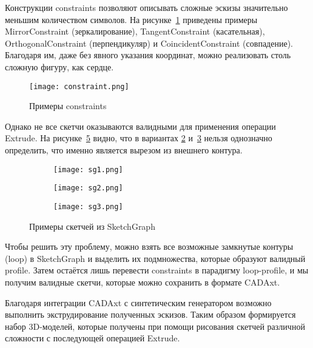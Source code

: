 Конструкции constraints позволяют описывать сложные эскизы значительно меньшим количеством символов. На рисунке~\ref{fig:constraint} приведены примеры MirrorConstraint (зеркалирование), TangentConstraint (касательная), OrthogonalConstraint (перпендикуляр) и CoincidentConstraint (совпадение). Благодаря им, даже без явного указания координат, можно реализовать столь сложную фигуру, как сердце.

\begin{figure}[h!]
    \centering
    \texttt{[image: constraint.png]}
    \caption{Примеры constraints}
    \label{fig:constraint}
\end{figure}

Однако не все скетчи оказываются валидными для применения операции Extrude. На рисунке~\ref{fig:sketchgraph} видно, что в вариантах \ref{fig:sg1} и~\ref{fig:sg2} нельзя однозначно определить, что именно является вырезом из внешнего контура.

\begin{figure}[h!]
    \centering
    \begin{subfigure}[b]{0.3\textwidth}
        \centering
        \texttt{[image: sg1.png]}
        \caption{}
        \label{fig:sg1}
    \end{subfigure}
    \hfill
    \begin{subfigure}[b]{0.3\textwidth}
        \centering
        \texttt{[image: sg2.png]}
        \caption{}
        \label{fig:sg2}
    \end{subfigure}
    \hfill
    \begin{subfigure}[b]{0.3\textwidth}
        \centering
        \texttt{[image: sg3.png]}
        \caption{}
        \label{fig:sg3}
    \end{subfigure}
    \caption{Примеры скетчей из SketchGraph}
    \label{fig:sketchgraph}
\end{figure}

Чтобы решить эту проблему, можно взять все возможные замкнутые контуры (loop) в SketchGraph и выделить их подмножества, которые образуют валидный profile. Затем остаётся лишь перевести constraints в парадигму loop-profile, и мы получим валидные скетчи, которые можно сохранить в формате CADAxt.

Благодаря интеграции CADAxt с синтетическим генератором возможно выполнить экструдирование полученных эскизов. Таким образом формируется набор 3D-моделей, которые получены при помощи рисования скетчей различной сложности с последующей операцией Extrude.

